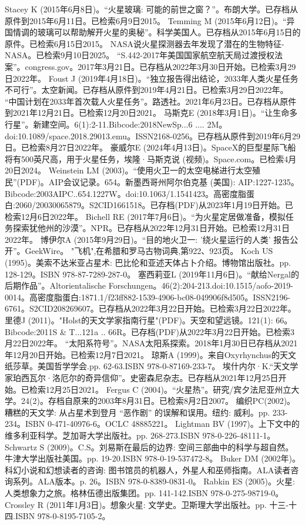 \begin{enumerate}
 Stacey K (2015年6月8日)。“火星玻璃: 可能的前世之窗？”。布朗大学。已存档从原件到2015年6月11日。已检索6月9日2015。
 Temming M (2015年6月12日)。“异国情调的玻璃可以帮助解开火星的奥秘”。科学美国人。已存档从2015年6月15日的原件。已检索6月15日2015。
 NASA说火星探测器去年发现了潜在的生物特征-NASA。已检索9月10日2025。
 “S.442-2017年美国国家航空航天局过渡授权法案”。congress.gov。2017年3月21日。已存档从2022年3月30日开始。已检索3月29日2022年。
 Foust J (2019年4月18日)。“独立报告得出结论，2033年人类火星任务不可行”。太空新闻。已存档从原件到2019年4月21日。已检索3月29日2022年。
 “中国计划在2033年首次载人火星任务”。路透社。2021年6月23日。已存档从原件到2021年12月21日。已检索12月20日2021。
 马斯克E (2018年3月1日)。“让生命多行星”。新建空间。6(1):2-11.Bibcode:2018NewSp...6 .... 2M。doi:10.1089/space.2018.29013.emu。ISSN2168-0256。已存档从原件到2019年6月29日。已检索8月27日2022年。 
 豪威尔E (2024年4月13日)。SpaceX的巨型星际飞船将有500英尺高，用于火星任务，埃隆·马斯克说 (视频)。Space.com。已检索4月20日2024。
 Weinstein LM (2003)。“使用火卫一的太空电梯进行太空殖民”(PDF)。AIP会议记录。654。新墨西哥州阿尔伯克基 (美国): AIP:1227-1235。Bibcode:2003AIPC..654.1227W。doi:10.1063/1.1541423。高密度脂蛋白:2060/20030065879。S2CID1661518。已存档(PDF)从2023年1月19日开始。已检索12月6日2022年。  
 Bichell RE (2017年7月6日)。“为火星定居做准备，模拟任务探索犹他州的沙漠”。NPR。已存档从2022年12月31日开始。已检索12月31日2022年。
 博伊尔A (2015年9月29日)。“目的地火卫一: '绕火星运行的人类' 报告公开”。GeekWire。
 "飞机",在希腊和罗马古物词典,第922、923页。
 Koch US (1995)。美索不达米亚占星术: 巴比伦和亚述天体占卜介绍。博物馆出版社。pp. 128-129。ISBN 978-87-7289-287-0。
 塞西莉亚L (2019年11月6日)。“献给Nergal的后期作品”。Altorientalische Forschungen。46(2):204-213.doi:10.1515/aofo-2019-0014。高密度脂蛋白:1871.1/f23ff882-1539-4906-bc08-049906f8d505。ISSN2196-6761。S2CID208269607。已存档从2022年3月22日开始。已检索3月22日2022年。  
 里德J (2011)。"Holst的天文学家指南行星"(PDF)。天空和望远镜。121(1): 66。Bibcode:2011S & T...121a .. 66R。已存档(PDF)从2022年3月22日开始。已检索3月22日2022年。
 “太阳系符号”。NASA太阳系探索。2018年1月30日已存档从2021年12月20日开始。已检索12月7日2021。
 琼斯A (1999)。来自Oxyrhynchus的天文纸莎草。美国哲学学会.pp. 62-63.ISBN  978-0-87169-233-7。
 埃什内尔·K.“天文学家珀西瓦尔·洛厄尔的奇异信仰”。史密森尼杂志。已存档从2021年12月25日开始。已检索12月25日2021。
 Fergus C (2004)。“火星热”。研究/宾夕法尼亚州立大学。24(2)。存档自原来的2003年8月31日。已检索8月2日2007。
 编织PC(2002)。糟糕的天文学: 从占星术到登月 “恶作剧” 的误解和误用。纽约: 威利。pp. 233-234。ISBN 0-471-40976-6。OCLC 48885221。
 Lightman BV (1997)。上下文中的维多利亚科学。芝加哥大学出版社。pp. 268-273.ISBN 978-0-226-48111-1。
 Schwartz S (2009)。C.S。刘易斯在最后的边界: 空间三部曲中的科学与超自然。牛津大学出版社美国。pp. 19-20.ISBN 978-0-19-537472-8。
 Buker DM (2002年)。科幻小说和幻想读者的咨询: 图书馆员的机器人，外星人和巫师指南。ALA读者咨询系列。ALA版本。p. 26。ISBN 978-0-8389-0831-0。
 Rabkin ES (2005)。火星: 人类想象力之旅。格林伍德出版集团。pp. 141-142.ISBN 978-0-275-98719-0。
 Crossley R (2011年1月3日)。想象火星: 文学史。卫斯理大学出版社。pp. 十三-十四.ISBN 978-0-8195-7105-2。


\end{enumerate}